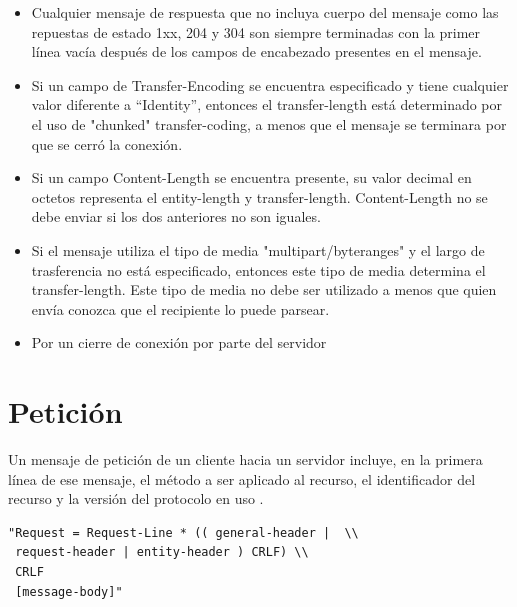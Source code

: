 \begin{description}
\begin{itemize}
\item Cualquier mensaje de respuesta que no incluya cuerpo del mensaje como las repuestas de estado 1xx, 204 y 304 son siempre terminadas con la primer línea vacía después de los campos de encabezado presentes en el mensaje.
\item Si un campo de Transfer-Encoding se encuentra especificado y tiene cualquier valor diferente a “Identity”, entonces el transfer-length está determinado por el uso de "chunked" transfer-coding, a menos que el mensaje se terminara por que se cerró la conexión.
\item Si un campo Content-Length se encuentra presente, su valor decimal en octetos representa el entity-length y transfer-length. Content-Length no se debe enviar si los dos anteriores no son iguales. 
\item Si el mensaje utiliza el tipo de media "multipart/byteranges" y el largo de trasferencia no está especificado, entonces este tipo de media determina el transfer-length. Este tipo de media no debe ser utilizado a menos que quien envía conozca que el recipiente lo puede parsear.
\item Por un cierre de conexión por parte del servidor

\end{itemize}


\end{description}

\section{Petición}
Un mensaje de petición de un cliente hacia un servidor incluye, en la primera línea de ese mensaje, el método a ser aplicado al recurso, el identificador del recurso y la versión del protocolo en uso \cite{rfc2616}.

\begin{lstlisting}[caption={Mensaje de petición},label={lst:mensajes_peticion}]
"Request = Request-Line * (( general-header |  \\
 request-header | entity-header ) CRLF) \\  
 CRLF
 [message-body]"
\end{lstlisting}

